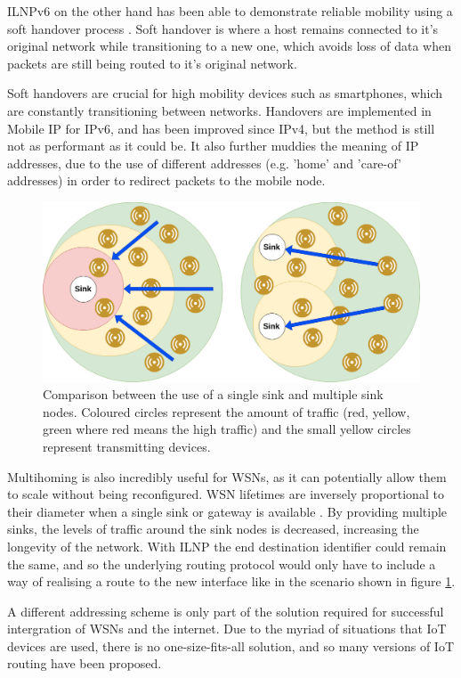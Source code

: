 \documentclass[12pt]{article}
\begin{document}
ILNPv6 on the other hand has been able to demonstrate reliable mobility using a soft handover process \cite{shilnp}. Soft handover is where a host remains connected to it's original network while transitioning to a new one, which avoids loss of data when packets are still being routed to it's original network. 

Soft handovers are crucial for high mobility devices such as smartphones, which are constantly transitioning between networks. Handovers are implemented in Mobile IP for IPv6, and has been improved since IPv4, but the method is still not as performant as it could be. It also further muddies the meaning of IP addresses, due to the use of different addresses (e.g. 'home' and 'care-of' addresses) in order to redirect packets to the mobile node. 

\begin{figure}[!ht]
	\centering
	\includegraphics[width=\linewidth]{images/diameter}
	\caption{Comparison between the use of a single sink and multiple sink nodes. Coloured circles represent the amount of traffic (red, yellow, green where red means the high traffic) and the small yellow circles represent transmitting devices.}
	\label{fig:diameter}
\end{figure}

Multihoming is also incredibly useful for WSNs, as it can potentially allow them to scale without being reconfigured. WSN lifetimes are inversely proportional to their diameter when a single sink or gateway is available \cite{multisink}. By providing multiple sinks, the levels of traffic around the sink nodes is decreased, increasing the longevity of the network. With ILNP the end destination identifier could remain the same, and so the underlying routing protocol would only have to include a way of realising a route to the new interface like in the scenario shown in figure \ref{fig:diameter}.

A different addressing scheme is only part of the solution required for successful intergration of WSNs and the internet. Due to the myriad of situations that IoT devices are used, there is no one-size-fits-all solution, and so many versions of IoT routing have been proposed.
\end{document}
